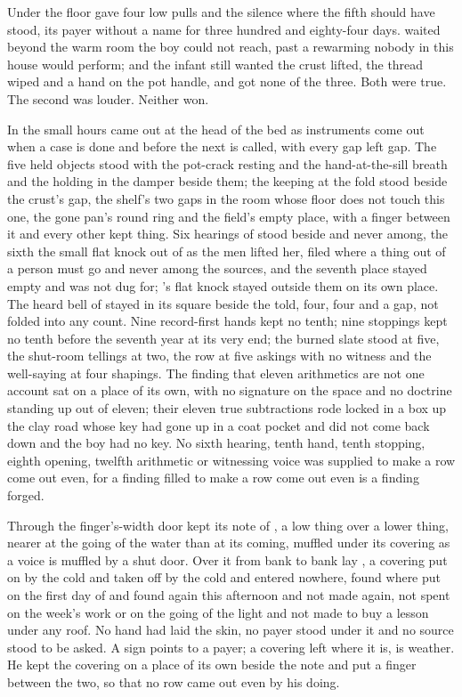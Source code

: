 Under the floor  gave four low pulls and the silence where the fifth should have stood, its payer without a name for three hundred and eighty-four days.  waited beyond the warm room the boy could not reach, past a rewarming nobody in this house would perform; and the infant still wanted the crust lifted, the thread wiped and a hand on the pot handle, and got none of the three. Both were true. The second was louder. Neither won.

\scenebreak

In the small hours  came out at the head of the bed as instruments come out when a case is done and before the next is called, with every gap left gap. The five held objects stood with the pot-crack resting and the hand-at-the-sill breath and the holding in the damper beside them; the keeping at the fold stood beside the crust's gap, the shelf's two gaps in the room whose floor does not touch this one, the gone pan's round ring and the field's empty place, with a finger between it and every other kept thing. Six hearings of  stood beside and never among, the sixth the small flat knock out of  as the men lifted her, filed where a thing out of a person must go and never among the sources, and the seventh place stayed empty and was not dug for; 's flat knock stayed outside them on its own place. The heard bell of  stayed in its square beside the told, four, four and a gap, not folded into any count. Nine record-first hands kept no tenth; nine stoppings kept no tenth before the seventh year at its very end; the burned slate stood at five, the shut-room tellings at two, the row at five askings with no witness and the well-saying at four shapings. The finding that eleven arithmetics are not one account sat on a place of its own, with no signature on the space and no doctrine standing up out of eleven; their eleven true subtractions rode locked in a box up the clay road whose key had gone up in a coat pocket and did not come back down and the boy had no key. No sixth hearing, tenth hand, tenth stopping, eighth opening, twelfth arithmetic or witnessing voice was supplied to make a row come out even, for a finding filled to make a row come out even is a finding forged.

Through the finger's-width door  kept its note of , a low thing over a lower thing, nearer at the going of the water than at its coming, muffled under its covering as a voice is muffled by a shut door. Over it from bank to bank lay , a covering put on by the cold and taken off by the cold and entered nowhere, found where put on the first day of  and found again this afternoon and not made again, not spent on the week's work or on the going of the light and not made to buy a lesson under any roof. No hand had laid the skin, no payer stood under it and no source stood to be asked. A sign points to a payer; a covering left where it is, is weather. He kept the covering on a place of its own beside the note and put a finger between the two, so that no row came out even by his doing.

